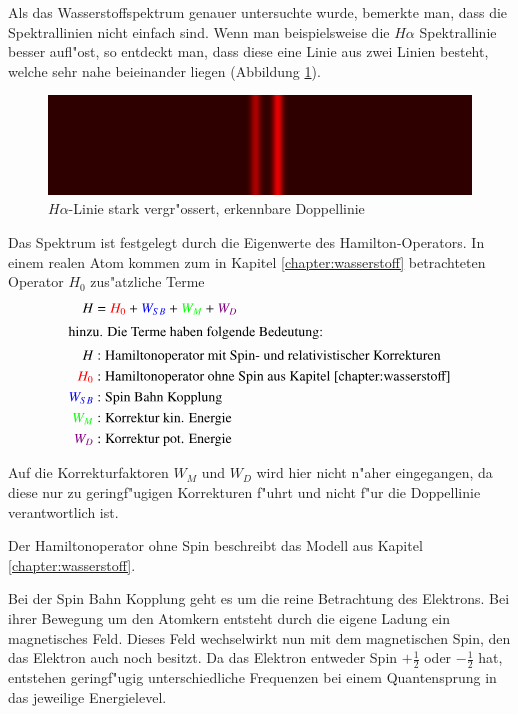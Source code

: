 \begin{refsection}
Als das Wasserstoffspektrum genauer untersuchte wurde, bemerkte man,
dass die Spektrallinien nicht einfach sind. Wenn man beispielsweise die
$H\alpha$ Spektrallinie besser aufl"ost, so entdeckt man, dass diese
eine Linie aus zwei Linien besteht, welche sehr nahe beieinander
liegen (Abbildung \ref{atomuhr:fineStructure}).

\begin{figure}
	\centering
	\includegraphics[width = .6\columnwidth]{atomuhr/fine_structure_hydrogen.png}
	\caption{$H\alpha$-Linie stark vergr"ossert, erkennbare
          Doppellinie \cite{pic:wasserstoff_feinstruktur}}
        \label{atomuhr:fineStructure}
\end{figure}

Das Spektrum ist festgelegt durch die Eigenwerte des
Hamilton-Operators. In einem realen Atom kommen zum in Kapitel
\ref{chapter:wasserstoff} betrachteten Operator \(H_0\) zus"atzliche Terme
\begin{align*}
  H &= \textcolor{red}{H_0}+ \textcolor{blue}{W_{SB}} +
  \textcolor{green}{W_M} + \textcolor{violet}{W_D}\\
  \intertext{hinzu. Die Terme haben folgende Bedeutung:}
  H&: \text{Hamiltonoperator mit Spin- und relativistischer Korrekturen}\\
  \textcolor{red}{H_0}&: \text{Hamiltonoperator ohne Spin aus
    Kapitel \ref{chapter:wasserstoff}}\\
  \textcolor{blue}{W_{SB}}&: \text{Spin Bahn Kopplung}\\
  \textcolor{green}{W_M}&: \text{Korrektur kin. Energie}\\
  \textcolor{violet}{W_D}&: \text{Korrektur pot. Energie}
\end{align*}
		
Auf die Korrekturfaktoren $W_M$ und $W_D$ wird hier nicht n"aher
eingegangen, da diese nur zu geringf"ugigen Korrekturen f"uhrt und
nicht f"ur die Doppellinie verantwortlich ist.

Der Hamiltonoperator ohne Spin beschreibt das Modell aus Kapitel
\ref{chapter:wasserstoff}.

Bei der Spin Bahn Kopplung geht es um die reine Betrachtung des
%
Elektrons.  Bei ihrer Bewegung um den Atomkern entsteht durch die
eigene Ladung ein magnetisches Feld.  Dieses Feld wechselwirkt nun mit
dem magnetischen Spin, den das Elektron auch noch besitzt.  Da das
Elektron entweder Spin \(+\frac{1}{2}\) oder \(-\frac{1}{2}\) hat,
entstehen geringf"ugig unterschiedliche Frequenzen bei einem
Quantensprung in das jeweilige Energielevel.


\end{refsection}
